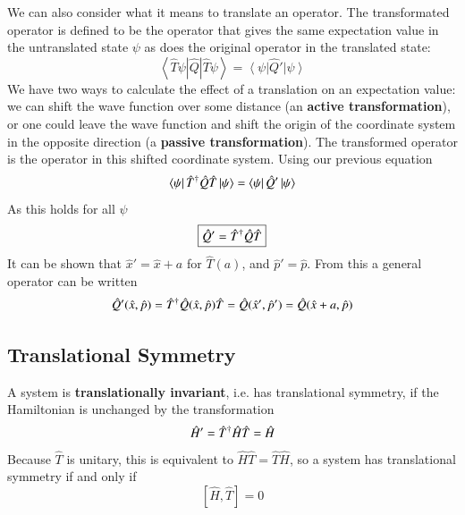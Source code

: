 \documentclass[12pt, a4paper, oneside, openright, titlepage]{book}
\newcommand{\bra}[1]{\left\langle#1\right\vert}
\newcommand{\ket}[1]{\left\vert#1\right\rangle}
\begin{document}
We can also consider what it means to translate an operator. The transformated operator is defined to be the operator that gives the same expectation value in the untranslated state $\psi$ as does the original operator in the translated state: \begin{equation*}
    \left\langle \hat{T}\psi\right\vert\hat{Q}\left\vert \hat{T}\psi\right\rangle = \bra{\psi}\hat{Q}'\ket{\psi}
\end{equation*}
We have two ways to calculate the effect of a translation on an expectation value: we can shift the wave function over some distance (an \textbf{active transformation}), or one could leave the wave function and shift the origin of the coordinate system in the opposite direction (a \textbf{passive transformation}). The transformed operator is the operator in this shifted coordinate system. Using our previous equation \begin{equation*}
    \bra{\psi}\hat{T}^{\text{\textdagger}}\hat{Q}\hat{T}\ket{\psi} = \bra{\psi}\hat{Q}'\ket{\psi}
\end{equation*}
As this holds for all $\psi$ \begin{equation*}
    \boxed{\hat{Q}' =\hat{T}^{\text{\textdagger}}\hat{Q}\hat{T}}
\end{equation*}
It can be shown that $\hat{x}' = \hat{x}+a$ for $\hat{T}(a)$, and $\hat{p}' = \hat{p}$. From this a general operator can be written \begin{equation*}
    \hat{Q}'(\hat{x},\hat{p}) = \hat{T}^{\text{\textdagger}}\hat{Q}(\hat{x},\hat{p})\hat{T} = \hat{Q}(\hat{x}',\hat{p}') = \hat{Q}(\hat{x}+a,\hat{p})
\end{equation*}

\subsection{Translational Symmetry}

A system is \textbf{translationally invariant}, i.e. has translational symmetry, if the Hamiltonian is unchanged by the transformation \begin{equation*}
    \hat{H}' = \hat{T}^{\text{\textdagger}}\hat{H}\hat{T} = \hat{H}
\end{equation*}
Because $\hat{T}$ is unitary, this is equivalent to $\hat{H}\hat{T} = \hat{T}\hat{H}$, so a system has translational symmetry if and only if \begin{equation*}
    \left[\hat{H},\hat{T}\right] = 0
\end{equation*}
\end{document}
